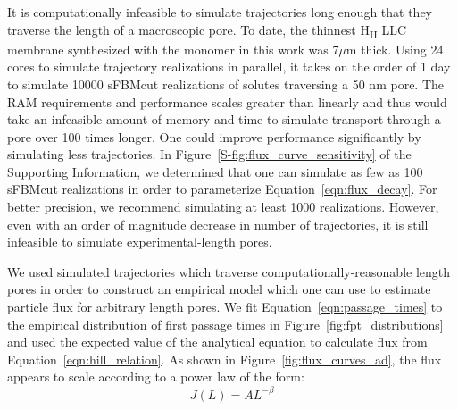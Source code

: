 \documentclass[aps,pre,preprint,groupedaddress]{revtex4-2}
\begin{document}
  It is computationally infeasible to simulate trajectories long enough that they
  traverse the length of a macroscopic pore. To date, the thinnest H\textsubscript{II}
  LLC membrane synthesized with the monomer in this work was 7$\mu$m thick. Using
  24 cores to simulate trajectory realizations in parallel, it takes on the order 
  of 1 day to simulate 10000 sFBMcut realizations of solutes traversing a 50 nm pore.
  The RAM requirements and performance scales greater than linearly and thus would
  take an infeasible amount of memory and time to simulate transport through a pore
  over 100 times longer. One could improve performance significantly by simulating 
  less trajectories. In Figure~\ref{S-fig:flux_curve_sensitivity} of the Supporting 
  Information, we determined that one can simulate as few as 100 sFBMcut realizations
  in order to parameterize Equation~\ref{eqn:flux_decay}. For better precision, we 
  recommend simulating at least 1000 realizations. However, even with an order of 
  magnitude decrease in number of trajectories, it is still infeasible to simulate
  experimental-length pores.
  
  We used simulated trajectories which traverse computationally-reasonable length
  pores in order to construct an empirical model which one can use to estimate 
  particle flux for arbitrary length pores. We fit Equation~\ref{eqn:passage_times}
  to the empirical distribution of first passage times in Figure~\ref{fig:fpt_distributions}
  and used the expected value of the analytical equation to calculate flux from 
  Equation~\ref{eqn:hill_relation}. As shown in Figure~\ref{fig:flux_curves_ad}, 
  the flux appears to scale according to a power law of the form:
  \begin{equation}
  J(L) = AL^{-\beta} 
  \label{eqn:flux_decay}
  \end{equation}
\end{document}

